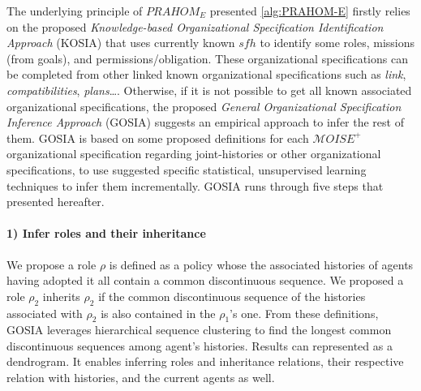 \documentclass[runningheads]{llncs}
\newcounter{relation}
\begin{document}

\noindent The underlying principle of $PRAHOM_E$ presented \autoref{alg:PRAHOM-E} firstly relies on the proposed \emph{Knowledge-based Organizational Specification Identification Approach} (KOSIA) that uses currently known $sfh$ to identify some roles, missions (from goals), and permissions/obligation. These organizational specifications can be completed from other linked known organizational specifications such as \emph{link}, \emph{compatibilities}, \emph{plans}\dots. %
%
Otherwise, if it is not possible to get all known associated organizational specifications, the proposed \emph{General Organizational Specification Inference Approach} (GOSIA) suggests an empirical approach to infer the rest of them.
GOSIA is based on some proposed definitions for each $\mathcal{M}OISE^+$ organizational specification regarding joint-histories or other organizational specifications, to use suggested specific statistical, unsupervised learning techniques to infer them incrementally. GOSIA runs through five steps that presented hereafter.
%
\paragraph{1) Infer roles and their inheritance}

We propose a role $\rho$ is defined as a policy whose the associated histories of agents having adopted it all contain a common discontinuous sequence. We proposed a role $\rho_2$ inherits $\rho_2$ if the common discontinuous sequence of the histories associated with $\rho_2$ is also contained in the $\rho_1$'s one.
From these definitions, GOSIA leverages hierarchical sequence clustering to find the longest common discontinuous sequences among agent's histories. Results can represented as a dendrogram. It enables inferring roles and inheritance relations, their respective relation with histories, and the current agents as well.
\end{document}
